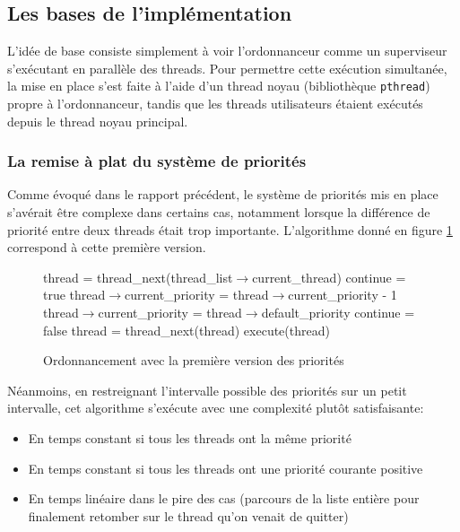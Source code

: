 \documentclass[a4paper,11pt]{article}
\begin{document}
\subsection{Les bases de l'implémentation}

L'idée de base consiste simplement à voir l'ordonnanceur comme un superviseur s'exécutant en parallèle des threads. Pour permettre cette exécution simultanée, la mise en place s'est faite à l'aide d'un thread noyau (bibliothèque \texttt{pthread}) propre à l'ordonnanceur, tandis que les threads utilisateurs étaient exécutés depuis le thread noyau principal.

\subsubsection*{La remise à plat du système de priorités}

Comme évoqué dans le rapport précédent, le système de priorités mis en place s'avérait être complexe dans certains cas, notamment lorsque la différence de priorité entre deux threads était trop importante. L'algorithme donné en figure \ref{priority1} correspond à cette première version.

\begin{figure}[H]
\begin{algorithm}[H]
 thread = thread\_next(thread\_list$\rightarrow$current\_thread)\;
 continue = true\;
  {
 	thread$\rightarrow$current\_priority = thread$\rightarrow$current\_priority - 1\;
 	 {
 			thread$\rightarrow$current\_priority = thread$\rightarrow$default\_priority\;
 		}
 	 {
 		continue = false\;
 	}{
 	thread = thread\_next(thread)\;
 	}
  }
  execute(thread)\;
\end{algorithm}
\caption{Ordonnancement avec la première version des priorités}
\label{priority1}
\end{figure}

Néanmoins, en restreignant l'intervalle possible des priorités sur un petit intervalle, cet algorithme s'exécute avec une complexité plutôt satisfaisante:
\begin{itemize}
 \item En temps constant si tous les threads ont la même priorité
 \item En temps constant si tous les threads ont une priorité courante positive
 \item En temps linéaire dans le pire des cas (parcours de la liste entière pour finalement retomber sur le thread qu'on venait de quitter)
\end{itemize}
\end{document}
